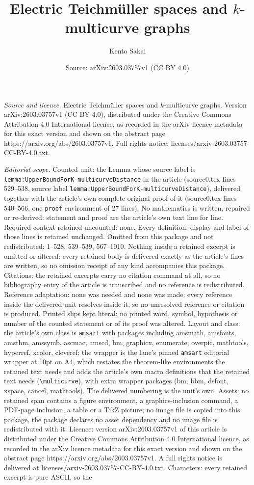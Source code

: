 \documentclass[10pt,a4paper]{amsart}
\title[Electric Teichm\"uller spaces and $k$-multicurve graphs]{Electric Teichm\"uller spaces and $k$-multicurve graphs}
\author{Kento Sakai}
\date{Source: arXiv:2603.03757v1 (CC BY 4.0)}
\begin{document}
\maketitle

\noindent\emph{Source and licence.} Electric Teichm\"uller spaces and $k$-multicurve graphs. Version arXiv:2603.03757v1 (CC BY 4.0), distributed under the Creative Commons Attribution 4.0 International licence, as recorded in the arXiv licence metadata for this exact version and shown on the abstract page https://arxiv.org/abs/2603.03757v1. Full rights notice: licenses/arxiv-2603.03757-CC-BY-4.0.txt.\par\smallskip

\noindent\textit{Editorial scope.} Counted unit: the Lemma whose source label is \texttt{lemma:UpperBoundForK-multicurveDistance} in the article (source0.tex lines 529--538, source label \texttt{lemma:UpperBoundForK-multicurveDistance}), delivered together with the article's own complete original proof of it (source0.tex lines 540--566, one \texttt{proof} environment of 27 lines). No mathematics is written, repaired or re-derived: statement and proof are the article's own text line for line. Required context retained uncounted: none. Every definition, display and label of those lines is retained unchanged. Omitted from this package and not redistributed: 1--528, 539--539, 567--1010. Nothing inside a retained excerpt is omitted or altered: every retained body is delivered exactly as the article's lines are written, so no omission receipt of any kind accompanies this package. Citations: the retained excerpts carry no citation command at all, so no bibliography entry of the article is transcribed and no reference is redistributed. Reference adaptation: none was needed and none was made; every reference inside the delivered unit resolves inside it, so no unresolved reference or citation is produced. Printed slips kept literal: no printed word, symbol, hypothesis or number of the counted statement or of its proof was altered. Layout and class: the article's own class is \texttt{amsart} with packages including amsmath, amsfonts, amsthm, amssymb, ascmac, amscd, bm, graphicx, enumerate, overpic, mathtools, hyperref, xcolor, cleveref; the wrapper is the lane's pinned \texttt{amsart} editorial wrapper at 10pt on A4, which restates the theorem-like environments the retained text needs and adds the article's own macro definitions that the retained text needs (\texttt{\textbackslash multicurve}), with extra wrapper packages (bm, bbm, dsfont, xspace, cancel, mathtools). The delivered numbering is the unit's own. Assets: no retained span contains a figure environment, a graphics-inclusion command, a PDF-page inclusion, a table or a TikZ picture; no image file is copied into this package, the package declares no asset dependency and no image file is redistributed with it. Licence: version arXiv:2603.03757v1 of this article is distributed under the Creative Commons Attribution 4.0 International licence, as recorded in the arXiv licence metadata for this exact version and shown on the abstract page https://arxiv.org/abs/2603.03757v1. A full rights notice is delivered at licenses/arxiv-2603.03757-CC-BY-4.0.txt. Characters: every retained excerpt is pure ASCII, so the 
\end{document}
